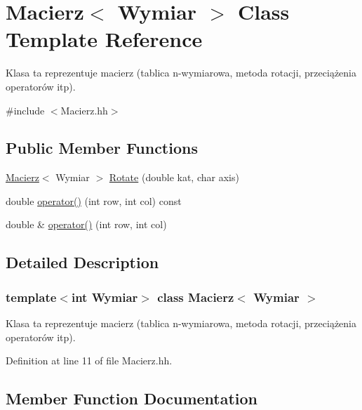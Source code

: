 \hypertarget{class_macierz}{}\section{Macierz$<$ Wymiar $>$ Class Template Reference}
\label{class_macierz}


Klasa ta reprezentuje macierz (tablica n-\/wymiarowa, metoda rotacji, przeciążenia operatorów itp).  




{\ttfamily \#include $<$Macierz.\+hh$>$}

\subsection*{Public Member Functions}
\begin{DoxyCompactItemize}
\item 
\hyperlink{class_macierz}{Macierz}$<$ Wymiar $>$ \hyperlink{class_macierz_ad7d0f072e450b04740723cfa7b13af17}{Rotate} (double kat, char axis)
\item 
double \hyperlink{class_macierz_a91dc52fcb641b2f6bc80e787a929e77d}{operator()} (int row, int col) const
\item 
double \& \hyperlink{class_macierz_af32ae3d8e121a456dad8372bcfa47c6f}{operator()} (int row, int col)
\end{DoxyCompactItemize}


\subsection{Detailed Description}
\subsubsection*{template$<$int Wymiar$>$\newline
class Macierz$<$ Wymiar $>$}

Klasa ta reprezentuje macierz (tablica n-\/wymiarowa, metoda rotacji, przeciążenia operatorów itp). 

Definition at line 11 of file Macierz.\+hh.



\subsection{Member Function Documentation}
\mbox{\label{class_macierz_a91dc52fcb641b2f6bc80e787a929e77d}} 
